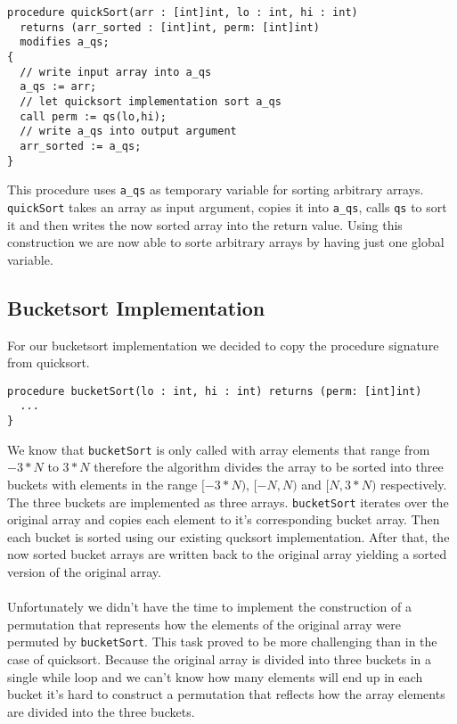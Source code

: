 \begin{verbatim}
procedure quickSort(arr : [int]int, lo : int, hi : int) 
  returns (arr_sorted : [int]int, perm: [int]int) 
  modifies a_qs;
{
  // write input array into a_qs
  a_qs := arr;
  // let quicksort implementation sort a_qs
  call perm := qs(lo,hi);
  // write a_qs into output argument
  arr_sorted := a_qs;
}
\end{verbatim}

This procedure uses \texttt{a\_qs} as temporary variable for sorting arbitrary arrays. \texttt{quickSort} takes an array 
as input argument, copies it into \texttt{a\_qs}, calls \texttt{qs} to sort it and then writes the now sorted array into
the return value. Using this construction we are now able to sorte arbitrary arrays by having just one global variable.


\subsection{Bucketsort Implementation}
For our bucketsort implementation we decided to copy the procedure signature from quicksort. 

\begin{verbatim}
procedure bucketSort(lo : int, hi : int) returns (perm: [int]int)
  ...
}
\end{verbatim}

We know that \texttt{bucketSort} is only called with array elements that range from $-3*N$ to $3*N$ therefore
the algorithm divides the array to be sorted into three buckets with elements in the range $[-3*N)$, $[-N,N)$ and
$[N,3*N)$ respectively. The three buckets are implemented as three arrays. \texttt{bucketSort} iterates over the original
array and copies each element to it's corresponding bucket array. Then each bucket is sorted using our existing qucksort implementation.
After that, the now sorted bucket arrays are written back to the original array yielding a sorted version of the original array. 
\\\\
Unfortunately we didn't have the time to implement the construction of a permutation that represents how the elements of the original array were 
permuted by \texttt{bucketSort}. This task proved to be more challenging than in the case of quicksort. Because the original array is divided into 
three buckets in a single while loop and we can't know how many elements will end up in each bucket it's hard to construct a permutation that reflects
how the array elements are divided into the three buckets.

